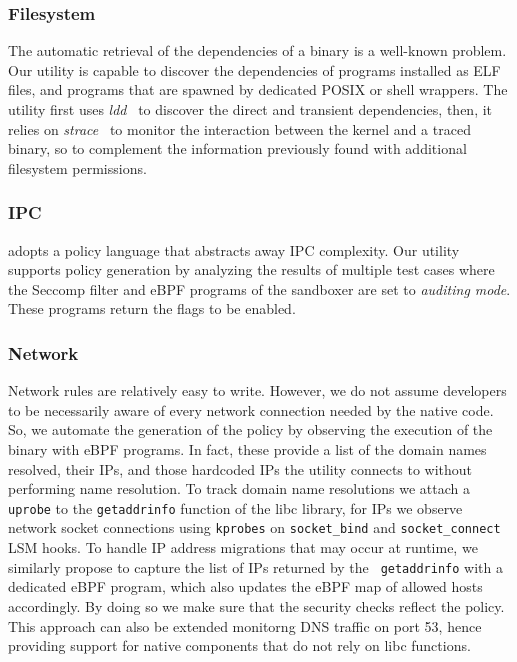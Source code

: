 \subsubsection*{Filesystem}

The automatic retrieval of the dependencies of a binary is a
well-known problem. Our utility is capable to discover the
dependencies of programs installed as ELF files, and programs that are
spawned by dedicated POSIX or shell wrappers. The utility first uses
{\em ldd}~\cite{linux-ldd} to discover the direct and transient
dependencies, then, it relies on {\em strace}~\cite{linux-strace} to
monitor the interaction between the kernel and a traced binary, so to
complement the information previously found with additional
filesystem permissions.

\subsubsection*{IPC}

\pap adopts a policy language that abstracts away IPC complexity.  Our
utility supports policy generation by analyzing the results of
multiple test cases where the Seccomp filter and eBPF
programs of the sandboxer are set to {\em auditing mode}.  These
programs return the flags to be enabled.

\subsubsection*{Network}

Network rules are relatively easy to write. However, we do not
assume developers to be necessarily aware of every network connection
needed by the native code. So, we automate the generation of the
policy by observing the execution of the binary with eBPF programs.
In fact, these provide a list of the domain names resolved, their IPs,
and those hardcoded IPs the utility connects to without performing
name resolution. To track domain name resolutions we attach a {\tt 
  uprobe} to the {\tt getaddrinfo} function of the libc library,
for IPs we observe network socket connections using {\tt kprobes} on
{\tt socket\_bind} and {\tt socket\_connect} LSM hooks.
%
 To handle IP address migrations that may occur at runtime,
  we similarly propose to capture the list of IPs returned by the {\tt
    getaddrinfo} with a dedicated eBPF program, which also updates the
  eBPF map of allowed hosts accordingly. By doing so we make sure that
  the security checks reflect the policy. This approach can also be
  extended monitorng DNS traffic on port 53, hence providing support
  for native components that do not rely on libc functions.  

